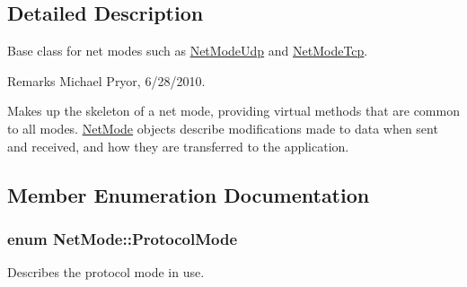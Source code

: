 \subsection{Detailed Description}
Base class for net modes such as \hyperlink{class_net_mode_udp}{NetModeUdp} and \hyperlink{class_net_mode_tcp}{NetModeTcp}. \begin{DoxyRemark}{Remarks}
Michael Pryor, 6/28/2010.
\end{DoxyRemark}
Makes up the skeleton of a net mode, providing virtual methods that are common to all modes. \hyperlink{class_net_mode}{NetMode} objects describe modifications made to data when sent and received, and how they are transferred to the application. 

\subsection{Member Enumeration Documentation}
\hypertarget{class_net_mode_a43cfa55ee6a4db66a8d7d6c27f766964}{
\subsubsection[{ProtocolMode}]{\setlength{\rightskip}{0pt plus 5cm}enum {\bf NetMode::ProtocolMode}}}
\label{class_net_mode_a43cfa55ee6a4db66a8d7d6c27f766964}


Describes the protocol mode in use. 

